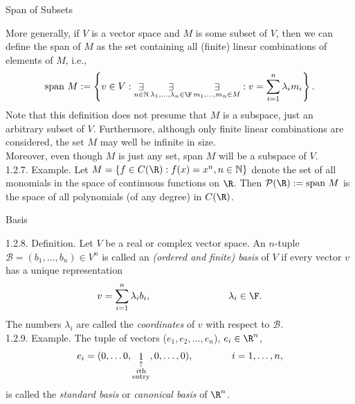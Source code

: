 \documentclass[smaller,hyperref={CJKbookmarks=true}]{beamer}
\newcommand{\N}{\mathbb{N}}
\newcommand{\myseries}[2]{$#1_1,#1_2,\dots,#1_#2$}
\begin{document}
\begin{frame}[t,shrink]{Span of Subsets} \begin{spacing}{1}
More generally, if $V$ is a vector space and $M$ is some subset of $V$, then we can define the span of $M$ as the set containing all (finite) linear combinations of elements of $M$, i.e.,
\[\text{span}~M:=\left\{v\in V:\mathop{\exists}_{n\in\N}\mathop{\exists}_{\lambda_1,\ldots,\lambda_n\in\F}\mathop{\exists}_{m_1,\ldots,m_n\in M}:v=\sum_{i=1}^{n}\lambda_im_i\right\}.\]
Note that this definition does not presume that $M$ is a subspace, just an arbitrary subset of $V$. Furthermore, although only finite linear combinations are considered, the set $M$ may well be infinite in size.\\[11pt]
Moreover, even though $M$ is just any set, span $M$ will be a subspace of $V$.\\[11pt]
\alert{1.2.7. Example.} Let $M=\{f\in C(\R):f(x)=x^n,n\in\N\}$ denote the set of all monomials in the space of continuous functions on $\R$. Then $\mathcal{P}(\R):=\text{span}~M$ is the space of all polynomials (of any degree) in $C(\R)$.
\end{spacing}
\end{frame}
\begin{frame}[t,shrink]{Basis}
\begin{spacing}{1}
\alert{1.2.8. Definition.} Let $V$ be a real or complex vector space. An $n$-tuple $\mathcal{B}=(b_1,\ldots,b_n)\in V^n$ is called an \emph{(ordered and finite) basis} of $V$ if every vector $v$ has a unique representation
\[v=\sum_{i=1}^{n}\lambda_ib_i,\qquad\qquad\qquad\qquad\lambda_i\in\F.\]
The numbers $\lambda_i$ are called the \emph{coordinates} of $v$ with respect to $\mathcal{B}$.\\[12pt]
\alert{1.2.9. Example.} The tuple of vectors (\myseries{e}{n}), $e_i\in\R^n$,
\begin{equation*}
  e_i=(0,\ldots 0,\mathop{1}_{\begin{subarray}{c}
\uparrow\\  i\text{th}\\ \text{entry}\end{subarray}},0,\ldots,0),\qquad\qquad i=1,\ldots,n,
\end{equation*}
is called the \emph{standard basis} or \emph{canonical basis} of $\R^n$.
\end{spacing}
\end{frame}
\end{document}
